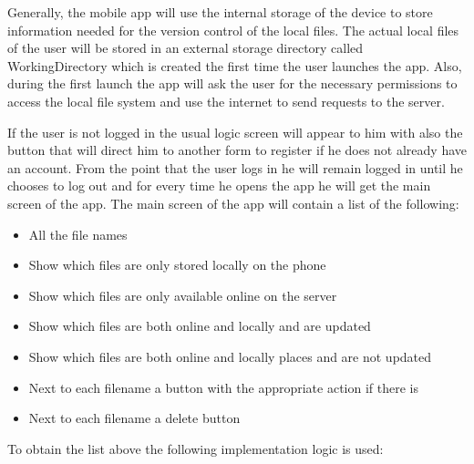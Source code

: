 \documentclass[11pt]{article}
\begin{document}
Generally, the mobile app will use the internal storage of the device to store information needed for the version control of the local files. The actual local files of the user will be stored in an external storage directory called WorkingDirectory which is created the first time the user launches the app. Also, during the first launch the app will ask the user for the necessary permissions to access the local file system and use the internet to send requests to the server.

If the user is not logged in the usual logic screen will appear to him with also the button that will direct him to another form to register if he does not already have an account. From the point that the user logs in he will remain logged in until he chooses to log out and for every time he opens the app he will get the main screen of the app. The main screen of the app will contain a list of the following:

\begin{itemize}
	\item{All the file names}
	\item{Show which files are only stored locally on the phone}
	\item{Show which files are only available online on the server}
	\item{Show which files are both online and locally and are updated}
	\item{Show which files are both online and locally places and are not updated}
	\item{Next to each filename a button with the appropriate action if there is}
	\item{Next to each filename a delete button}
\end{itemize}

To obtain the list above the following implementation logic is used:
\end{document}
